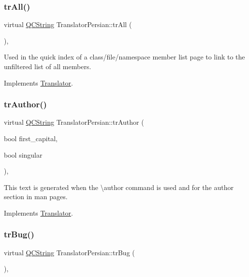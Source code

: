 \subsubsection{\texorpdfstring{trAll()}{trAll()}}
{\footnotesize\ttfamily virtual \mbox{\hyperlink{class_q_c_string}{Q\+C\+String}} Translator\+Persian\+::tr\+All (\begin{DoxyParamCaption}{ }\end{DoxyParamCaption})\hspace{0.3cm}{\ttfamily [inline]}, {\ttfamily [virtual]}}

Used in the quick index of a class/file/namespace member list page to link to the unfiltered list of all members. 

Implements \mbox{\hyperlink{class_translator}{Translator}}.

\mbox{\label{class_translator_persian_a9ae6f695433e6fb8c5bd1838954f5f0f}} 
\subsubsection{\texorpdfstring{trAuthor()}{trAuthor()}}
{\footnotesize\ttfamily virtual \mbox{\hyperlink{class_q_c_string}{Q\+C\+String}} Translator\+Persian\+::tr\+Author (\begin{DoxyParamCaption}\item[{bool}]{first\+\_\+capital,  }\item[{bool}]{singular }\end{DoxyParamCaption})\hspace{0.3cm}{\ttfamily [inline]}, {\ttfamily [virtual]}}

This text is generated when the \textbackslash{}author command is used and for the author section in man pages. 

Implements \mbox{\hyperlink{class_translator}{Translator}}.

\mbox{\label{class_translator_persian_a2109e7fbe5a39211e8fa6b4ba46212b8}} 
\subsubsection{\texorpdfstring{trBug()}{trBug()}}
{\footnotesize\ttfamily virtual \mbox{\hyperlink{class_q_c_string}{Q\+C\+String}} Translator\+Persian\+::tr\+Bug (\begin{DoxyParamCaption}{ }\end{DoxyParamCaption})\hspace{0.3cm}{\ttfamily [inline]}, {\ttfamily [virtual]}}

